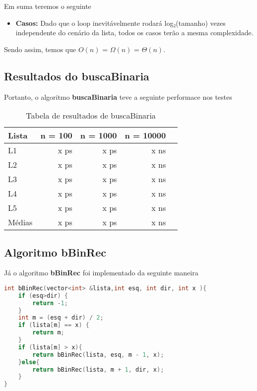 Em suma teremos o seguinte

\begin{itemize}
	\item \textbf{Casos:} Dado que o loop inevitávelmente rodará log₂(tamanho) vezes independente do cenário da lista, todos os casos terão a mesma complexidade.
 
\end{itemize}

Sendo assim, temos que $O(n)$ = $\Omega(n)$ = $\Theta(n)$.

\subsection{Resultados do buscaBinaria}

Portanto, o algoritmo \textbf{buscaBinaria} teve a seguinte performace nos testes

\begin{table}[h!]
	\centering
	\caption{Tabela de resultados de buscaBinaria}
	\label{tab:busc_bin_result}
	\begin{tabular}{lrrrr}
		\toprule
		Lista   & n = 100   & n = 1000  & n = 10000 \\
		\midrule
		L1      & x ps    & x ps    & x ns  \\
		L2      & x ps    & x ps    & x ns  \\
		L3      & x ps    & x ps    & x ns  \\
		L4      & x ps    & x ps    & x ns  \\
		L5      & x ps    & x ps    & x ns  \\
		\midrule
		Médias  & x ps  & x ps  & x ns \\
		\bottomrule
	\end{tabular}
\end{table}

\subsection{Algoritmo bBinRec}

Já o algoritmo \textbf{bBinRec} foi implementado da seguinte maneira 

\begin{lstlisting}[language=C++]
int bBinRec(vector<int> &lista,int esq, int dir, int x ){
    if (esq>dir) {
        return -1;
    }
    int m = (esq + dir) / 2;
    if (lista[m] == x) {
        return m;
    }
    if (lista[m] > x){
        return bBinRec(lista, esq, m - 1, x);
    }else{
        return bBinRec(lista, m + 1, dir, x);
    }
}
\end{lstlisting}

